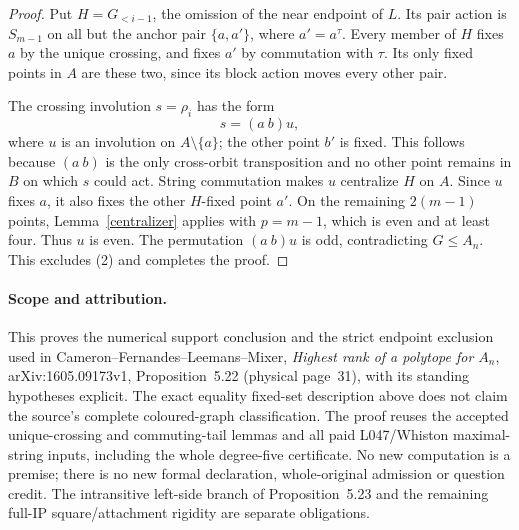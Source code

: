 \documentclass[11pt,a4paper]{article}
\begin{document}
\begin{proof}
Put $H=G_{<i-1}$, the omission of the near endpoint of $L$.
Its pair action is $S_{m-1}$ on all but the anchor pair
$\{a,a'\}$, where $a'=a^\tau$. Every member of $H$ fixes
$a$ by the unique crossing, and fixes $a'$ by commutation
with $\tau$. Its only fixed points in $A$ are these two,
since its block action moves every other pair.

The crossing involution $s=\rho_i$ has the form
\[
                         s=(a\ b)u,
\]
where $u$ is an involution on $A\setminus\{a\}$; the other
point $b'$ is fixed. This follows because $(a\ b)$ is the
only cross-orbit transposition and no other point remains
in $B$ on which $s$ could act. String commutation makes
$u$ centralize $H$ on $A$. Since $u$ fixes $a$, it also
fixes the other $H$-fixed point $a'$. On the remaining
$2(m-1)$ points, Lemma~\ref{centralizer} applies with
$p=m-1$, which is even and at least four. Thus $u$ is even.
The permutation $(a\ b)u$ is odd, contradicting $G\leq A_n$.
This excludes (2) and completes the proof.
\end{proof}

\paragraph{Scope and attribution.}
This proves the numerical support conclusion and the strict
endpoint exclusion used in Cameron--Fernandes--Leemans--Mixer,
\emph{Highest rank of a polytope for $A_n$}, arXiv:1605.09173v1,
Proposition~5.22 (physical page~31), with its standing
hypotheses explicit. The exact equality fixed-set description
above does not claim the source's complete coloured-graph
classification. The proof reuses the accepted unique-crossing
and commuting-tail lemmas and all paid L047/Whiston maximal-string
inputs, including the whole degree-five certificate. No new
computation is a premise; there is no new formal declaration,
whole-original admission or question credit. The intransitive
left-side branch of Proposition~5.23 and the remaining full-IP
square/attachment rigidity are separate obligations.
\end{document}

